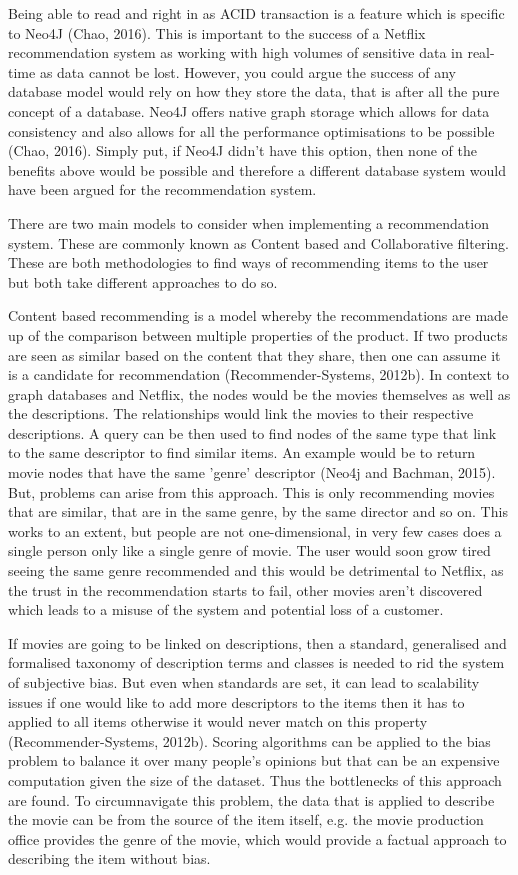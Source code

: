 \documentclass[a4paper]{article}
\begin{document}
Being able to read and right in as ACID transaction is a feature which is specific to Neo4J (Chao, 2016). This is important to the success of a Netflix recommendation system as working with high volumes of sensitive data in real-time as data cannot be lost. However, you could argue the success of any database model would rely on how they store the data, that is after all the pure concept of a database. Neo4J offers native graph storage which allows for data consistency and also allows for all the performance optimisations to be possible (Chao, 2016). Simply put, if Neo4J didn't have this option, then none of the benefits above would be possible and therefore a different database system would have been argued for the recommendation system. \par

There are two main models to consider when implementing a recommendation system. These are commonly known as Content based and Collaborative filtering. These are both methodologies to find ways of recommending items to the user but both take different approaches to do so.

Content based recommending is a model whereby the recommendations are made up of the comparison between multiple properties of the product. If two products are seen as similar based on the content that they share, then one can assume it is a candidate for recommendation (Recommender-Systems, 2012b). In context to graph databases and Netflix, the nodes would be the movies themselves as well as the descriptions. The relationships would link the movies to their respective descriptions. A query can be then used to find nodes of the same type that link to the same descriptor to find similar items. An example would be to return movie nodes that have the same 'genre' descriptor (Neo4j and Bachman, 2015). But, problems can arise from this approach. This is only recommending movies that are similar, that are in the same genre, by the same director and so on. This works to an extent, but people are not one-dimensional, in very few cases does a single person only like a single genre of movie. The user would soon grow tired seeing the same genre recommended and this would be detrimental to Netflix, as the trust in the recommendation starts to fail, other movies aren't discovered which leads to a misuse of the system and potential loss of a customer.

If movies are going to be linked on descriptions, then a standard, generalised and formalised taxonomy of description terms and classes is needed to rid the system of subjective bias. But even when standards are set, it can lead to scalability issues if one would like to add more descriptors to the items then it has to applied to all items otherwise it would never match on this property (Recommender-Systems, 2012b). Scoring algorithms can be applied to the bias problem to balance it over many people's opinions but that can be an expensive computation given the size of the dataset. Thus the bottlenecks of this approach are found. To circumnavigate this problem, the data that is applied to describe the movie can be from the source of the item itself, e.g. the movie production office provides the genre of the movie, which would provide a factual approach to describing the item without bias.
\end{document}
